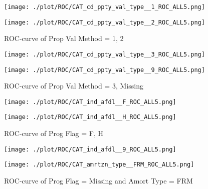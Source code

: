 \begin{figure}[H]
\begin{minipage}{.5\textwidth}
	\centering
	\texttt{[image: ./plot/ROC/CAT\_cd\_ppty\_val\_type\_\_1\_ROC\_ALL5.png]}
\end{minipage}%
\begin{minipage}{.5\textwidth}
	\centering
	\texttt{[image: ./plot/ROC/CAT\_cd\_ppty\_val\_type\_\_2\_ROC\_ALL5.png]}
\end{minipage}
    \caption{ROC-curve of Prop Val Method = 1, 2}
\end{figure}

\begin{figure}[H]
\begin{minipage}{.5\textwidth}
	\centering
	\texttt{[image: ./plot/ROC/CAT\_cd\_ppty\_val\_type\_\_3\_ROC\_ALL5.png]}
\end{minipage}%
\begin{minipage}{.5\textwidth}
	\centering
	\texttt{[image: ./plot/ROC/CAT\_cd\_ppty\_val\_type\_\_9\_ROC\_ALL5.png]}
\end{minipage}
    \caption{ROC-curve of Prop Val Method = 3, Missing}
\end{figure}

\begin{figure}[H]
\begin{minipage}{.5\textwidth}
	\centering
	\texttt{[image: ./plot/ROC/CAT\_ind\_afdl\_\_F\_ROC\_ALL5.png]}
\end{minipage}%
\begin{minipage}{.5\textwidth}
	\centering
	\texttt{[image: ./plot/ROC/CAT\_ind\_afdl\_\_H\_ROC\_ALL5.png]}
\end{minipage}
    \caption{ROC-curve of Prog Flag = F, H}
\end{figure}

\begin{figure}[H]
\begin{minipage}{.5\textwidth}
	\centering
	\texttt{[image: ./plot/ROC/CAT\_ind\_afdl\_\_9\_ROC\_ALL5.png]}
\end{minipage}%
\begin{minipage}{.5\textwidth}
	\centering
	\texttt{[image: ./plot/ROC/CAT\_amrtzn\_type\_\_FRM\_ROC\_ALL5.png]}
\end{minipage}
    \caption{ROC-curve of Prog Flag = Missing and Amort Type = FRM}
\end{figure}


